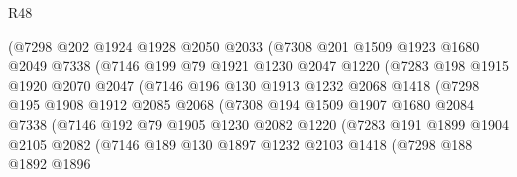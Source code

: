 \begin{lexlean}{R48}
\begin{coremodule}
                    (@7298
                      @202
                      @1924
                      @1928
                      @2050
                      @2033
                      (@7308
                        @201
                        @1509
                        @1923
                        @1680
                        @2049
                        @7338
                        (@7146
                          @199
                          @79
                          @1921
                          @1230
                          @2047
                          @1220
                          (@7283
                            @198
                            @1915
                            @1920
                            @2070
                            @2047
                            (@7146
                              @196
                              @130
                              @1913
                              @1232
                              @2068
                              @1418
                              (@7298
                                @195
                                @1908
                                @1912
                                @2085
                                @2068
                                (@7308
                                  @194
                                  @1509
                                  @1907
                                  @1680
                                  @2084
                                  @7338
                                  (@7146
                                    @192
                                    @79
                                    @1905
                                    @1230
                                    @2082
                                    @1220
                                    (@7283
                                      @191
                                      @1899
                                      @1904
                                      @2105
                                      @2082
                                      (@7146
                                        @189
                                        @130
                                        @1897
                                        @1232
                                        @2103
                                        @1418
                                        (@7298
                                          @188
                                          @1892
                                          @1896

\end{coremodule}
\end{lexlean}
